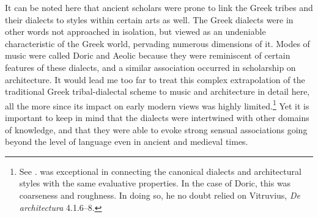 \begin{longtable}{>{\raggedright\arraybackslash\hangindent=.5em}p{3cm}>{\raggedright\arraybackslash}p{\textwidth - 3\tabcolsep - 3cm}}
\end{longtable}

It can be noted here that ancient scholars were prone to link the Greek tribes and their dialects to styles within certain arts as well. The Greek dialects were in other words not approached in isolation, but viewed as an undeniable characteristic of the Greek world, pervading numerous dimensions of it. Modes of music were called Doric and Aeolic because they were reminiscent of certain features of these dialects, and a similar association occurred in scholarship on architecture. It would lead me too far to treat this complex extrapolation of the traditional Greek tribal-dialectal scheme to music and architecture in detail here, all the more since its impact on early modern views was highly limited.\footnote{See \citet{Cassio1984}. \citet[118]{Mazzocchi1754} was exceptional in connecting the canonical dialects and architectural styles with the same evaluative properties. In the case of Doric, this was coarseness and roughness. In doing so, he no doubt relied on Vitruvius, \textit{De architectura} 4.1.6–8.} Yet it is important to keep in mind that the dialects were intertwined with other domains of knowledge, and that they were able to evoke strong sensual associations going beyond the level of language even in ancient and medieval times.

